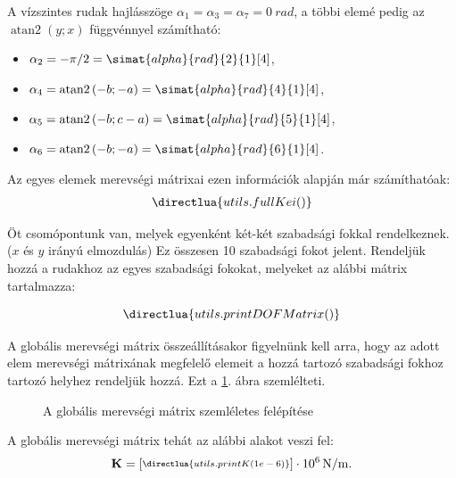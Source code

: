 \documentclass[a4paper, 12pt]{scrartcl}
\newcommand{\rmat}[1]{\mathbf{#1}}
\DeclareMathOperator\atann{atan2}
\begin{document}
A vízszintes rudak hajlásszöge $\alpha_1 = \alpha_3 = \alpha_7 = \SI{0}{rad}$,
a többi elemé pedig az $\atann(y; x)$ függvénnyel számítható:
\begin{multicols}{2}
  \begin{itemize}
    \item $\a_2 = -\pi/2 = \simat{alpha}{rad}{2}{1}[4]$,
    \item $\a_4 = \atann \left( -b; -a \right) = \simat{alpha}{rad}{4}{1}[4]$,
    \item $\a_5 = \atann \left( -b; c-a \right) = \simat{alpha}{rad}{5}{1}[4]$,
    \item $\a_6 = \atann \left( -b; -a \right) = \simat{alpha}{rad}{6}{1}[4]$.
  \end{itemize}
\end{multicols}

Az egyes elemek merevségi mátrixai ezen információk alapján már számíthatóak:
\begin{equation}
  \sisetup{
    exponent-mode = fixed,
    round-precision = 4
  }
  \begin{split}
    \directlua{utils.fullKei()}
  \end{split}
\end{equation}

Öt csomópontunk van, melyek egyenként két-két szabadsági fokkal rendelkeznek.
($x$ és $y$ irányú elmozdulás) Ez összesen 10 szabadsági fokot jelent.
Rendeljük hozzá a rudakhoz az egyes szabadsági fokokat, melyeket az alábbi
mátrix tartalmazza:

\begin{equation}
  \directlua{utils.printDOFMatrix()}
  \label{eq:DOF}
\end{equation}

A globális merevségi mátrix összeállításakor figyelnünk kell arra, hogy az adott
elem merevségi mátrixának megfelelő elemeit a hozzá tartozó szabadsági fokhoz
tartozó helyhez rendeljük hozzá. Ezt a \ref{fig:table}. ábra szemlélteti.
\begin{figure}[H]
  \centering
  
  \caption{A globális merevségi mátrix szemléletes felépítése}
  \label{fig:table}
\end{figure}

A globális merevségi mátrix tehát az alábbi alakot veszi fel:
\begin{equation}
  \sisetup{
    exponent-mode = fixed,
    round-precision = 5
  }
  \scriptsize{
    \rmat K = \begin{bmatrix}
      \directlua{utils.printK(1e-6)}
    \end{bmatrix} \cdot 10^6 \, \mathrm{N/m}
  }.
  \normalsize
  \label{eq:K}
\end{equation}
\end{document}

